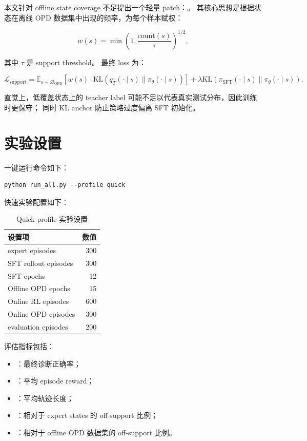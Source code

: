 \documentclass[11pt]{ctexart}
\begin{document}
本文针对 offline state coverage 不足提出一个轻量 patch：\supportopd{}。
其核心思想是根据状态在离线 OPD 数据集中出现的频率，为每个样本赋权：

\begin{equation}
w(s)
=
\min
\left(
1,
\frac{\mathrm{count}(s)}{\tau}
\right)^{1/2},
\end{equation}

其中 $\tau$ 是 support threshold。
最终 loss 为：

\begin{equation}
\mathcal{L}_{\text{support}}
=
\mathbb{E}_{s \sim \mathcal{D}_{\text{OPD}}}
\left[
w(s)
\cdot
\mathrm{KL}
\left(
q_T(\cdot \mid s)
\parallel
\pi_\theta(\cdot \mid s)
\right)
\right]
+
\lambda
\mathrm{KL}
\left(
\pi_{\text{SFT}}(\cdot \mid s)
\parallel
\pi_\theta(\cdot \mid s)
\right).
\end{equation}

直觉上，低覆盖状态上的 teacher label 可能不足以代表真实测试分布，因此训练时更保守；
同时 KL anchor 防止策略过度偏离 SFT 初始化。

\section{实验设置}

一键运行命令如下：

\begin{lstlisting}
python run_all.py --profile quick
\end{lstlisting}

快速实验配置如下：

\begin{table}[H]
\centering
\caption{Quick profile 实验设置}
\begin{tabular}{lr}
\toprule
设置项 & 数值 \\
\midrule
expert episodes & 300 \\
SFT rollout episodes & 300 \\
SFT epochs & 12 \\
Offline OPD epochs & 15 \\
Online RL episodes & 600 \\
Online OPD episodes & 300 \\
evaluation episodes & 200 \\
\bottomrule
\end{tabular}
\end{table}

评估指标包括：

\begin{itemize}
    \item {}：最终诊断正确率；
    \item {}：平均 episode reward；
    \item {}：平均轨迹长度；
    \item {}：相对于 expert states 的 off-support 比例；
    \item {}：相对于 offline OPD 数据集的 off-support 比例。
\end{itemize}
\end{document}
